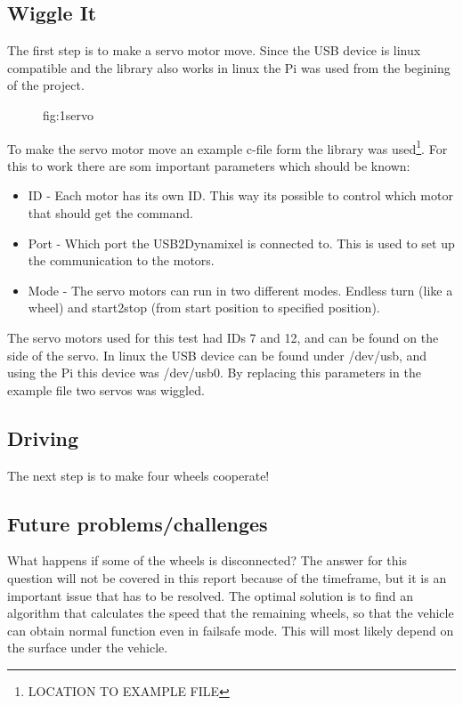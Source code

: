 \subsection{Wiggle It}
The first step is to make a servo motor move. 
Since the USB device is linux compatible and the library also works in linux the Pi was used from the begining of the project. 
\begin{figure}[H]
    \centering
    \caption{fig:1servo}
    \label{Servo motor test setup} 
\end{figure}

To make the servo motor move an example c-file form the library was used\footnote{LOCATION TO EXAMPLE FILE}. 
For this to work there are som important parameters which should be known:
\begin{itemize}
     \item ID - Each motor has its own ID. This way its possible to control which motor that should get the command. 
     \item Port - Which port the USB2Dynamixel is connected to. This is used to set up the communication to the motors. 
     \item Mode - The servo motors can run in two different modes. Endless turn (like a wheel) and start2stop (from start position to specified position). 
\end{itemize}
\vspace{\secspace}

The servo motors used for this test had IDs 7 and 12, and can be found on the side of the servo. 
In linux the USB device can be found under /dev/usb, and using the Pi this device was /dev/usb0. 
By replacing this parameters in the example file two servos was wiggled. 


\subsection{Driving}
The next step is to make four wheels cooperate! 


\subsection{Future problems/challenges}
What happens if some of the wheels is disconnected? 
The answer for this question will not be covered in this report because of the timeframe, but it is an important issue that has to be resolved. 
The optimal solution is to find an algorithm that calculates the speed that the remaining wheels, so that the vehicle can obtain normal function even in failsafe mode. 
This will most likely depend on the surface under the vehicle. 


